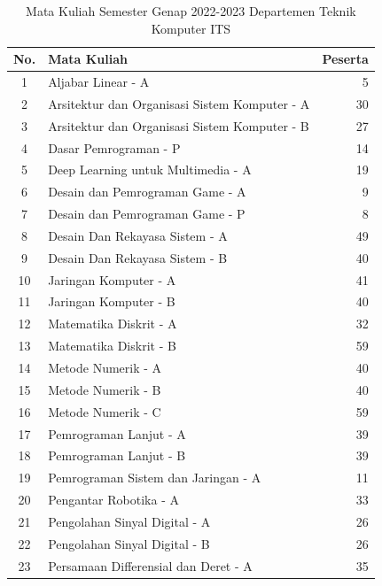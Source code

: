 \begin{longtable}{|c|l|r|}
  \caption{Mata Kuliah Semester Genap 2022-2023 \linebreak Departemen Teknik Komputer ITS}
  \label{tb:matkul}\\
  \hline
  \rowcolor[HTML]{D0CECE} 
  No. & Mata Kuliah & Peserta \\ \hline
  1  & Aljabar Linear - A                            & 5  \\
  2  & Arsitektur dan Organisasi Sistem Komputer - A & 30 \\
  3  & Arsitektur dan Organisasi Sistem Komputer - B & 27 \\
  4  & Dasar Pemrograman - P                         & 14 \\
  5  & Deep Learning untuk Multimedia - A            & 19 \\
  6  & Desain dan Pemrograman Game - A               & 9  \\
  7  & Desain dan Pemrograman Game - P               & 8  \\
  8  & Desain Dan Rekayasa Sistem - A                & 49 \\
  9  & Desain Dan Rekayasa Sistem - B                & 40 \\
  10 & Jaringan Komputer - A                         & 41 \\
  11 & Jaringan Komputer - B                         & 40 \\
  12 & Matematika Diskrit - A                        & 32 \\
  13 & Matematika Diskrit - B                        & 59 \\
  14 & Metode Numerik - A                            & 40 \\
  15 & Metode Numerik - B                            & 40 \\
  16 & Metode Numerik - C                            & 59 \\
  17 & Pemrograman Lanjut - A                        & 39 \\
  18 & Pemrograman Lanjut - B                        & 39 \\
  19 & Pemrograman Sistem dan Jaringan - A           & 11 \\
  20 & Pengantar Robotika - A                        & 33 \\
  21 & Pengolahan Sinyal Digital - A                 & 26 \\
  22 & Pengolahan Sinyal Digital - B                 & 26 \\
  23 & Persamaan Differensial dan Deret - A          & 35 \\

\end{longtable}

